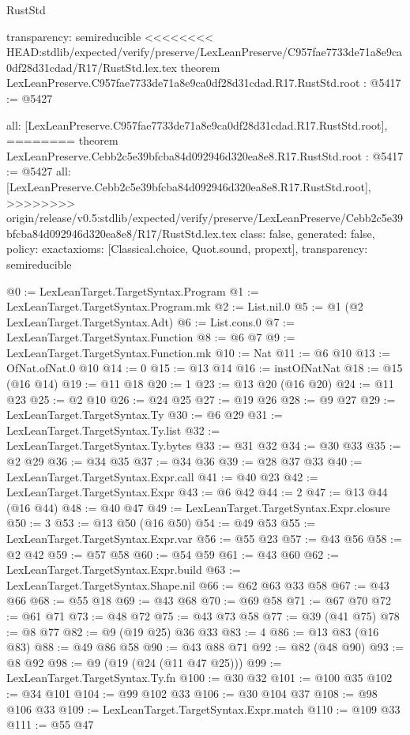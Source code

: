 \begin{lexlean}{RustStd}
\begin{coremodule}
{\begin{coremodule}
{{{{{{{{{{{{{{  transparency: semireducible
}
<<<<<<<< HEAD:stdlib/expected/verify/preserve/LexLeanPreserve/C957fae7733de71a8e9ca0df28d31cdad/R17/RustStd.lex.tex
theorem LexLeanPreserve.C957fae7733de71a8e9ca0df28d31cdad.R17.RustStd.root : @5417 := @5427 {
  all: [LexLeanPreserve.C957fae7733de71a8e9ca0df28d31cdad.R17.RustStd.root],
========
theorem LexLeanPreserve.Cebb2c5e39bfcba84d092946d320ea8e8.R17.RustStd.root : @5417 := @5427 {
  all: [LexLeanPreserve.Cebb2c5e39bfcba84d092946d320ea8e8.R17.RustStd.root],
>>>>>>>> origin/release/v0.5:stdlib/expected/verify/preserve/LexLeanPreserve/Cebb2c5e39bfcba84d092946d320ea8e8/R17/RustStd.lex.tex
  class: false,
  generated: false,
  policy: exact{axioms: [Classical.choice, Quot.sound, propext]},
  transparency: semireducible
}

@0 := LexLeanTarget.TargetSyntax.Program
@1 := LexLeanTarget.TargetSyntax.Program.mk
@2 := List.nil.{0}
@5 := @1 (@2 LexLeanTarget.TargetSyntax.Adt)
@6 := List.cons.{0}
@7 := LexLeanTarget.TargetSyntax.Function
@8 := @6 @7
@9 := LexLeanTarget.TargetSyntax.Function.mk
@10 := Nat
@11 := @6 @10
@13 := OfNat.ofNat.{0} @10
@14 := 0
@15 := @13 @14
@16 := instOfNatNat
@18 := @15 (@16 @14)
@19 := @11 @18
@20 := 1
@23 := @13 @20 (@16 @20)
@24 := @11 @23
@25 := @2 @10
@26 := @24 @25
@27 := @19 @26
@28 := @9 @27
@29 := LexLeanTarget.TargetSyntax.Ty
@30 := @6 @29
@31 := LexLeanTarget.TargetSyntax.Ty.list
@32 := LexLeanTarget.TargetSyntax.Ty.bytes
@33 := @31 @32
@34 := @30 @33
@35 := @2 @29
@36 := @34 @35
@37 := @34 @36
@39 := @28 @37 @33
@40 := LexLeanTarget.TargetSyntax.Expr.call
@41 := @40 @23
@42 := LexLeanTarget.TargetSyntax.Expr
@43 := @6 @42
@44 := 2
@47 := @13 @44 (@16 @44)
@48 := @40 @47
@49 := LexLeanTarget.TargetSyntax.Expr.closure
@50 := 3
@53 := @13 @50 (@16 @50)
@54 := @49 @53
@55 := LexLeanTarget.TargetSyntax.Expr.var
@56 := @55 @23
@57 := @43 @56
@58 := @2 @42
@59 := @57 @58
@60 := @54 @59
@61 := @43 @60
@62 := LexLeanTarget.TargetSyntax.Expr.build
@63 := LexLeanTarget.TargetSyntax.Shape.nil
@66 := @62 @63 @33 @58
@67 := @43 @66
@68 := @55 @18
@69 := @43 @68
@70 := @69 @58
@71 := @67 @70
@72 := @61 @71
@73 := @48 @72
@75 := @43 @73 @58
@77 := @39 (@41 @75)
@78 := @8 @77
@82 := @9 (@19 @25) @36 @33
@83 := 4
@86 := @13 @83 (@16 @83)
@88 := @49 @86 @58
@90 := @43 @88 @71
@92 := @82 (@48 @90)
@93 := @8 @92
@98 := @9 (@19 (@24 (@11 @47 @25)))
@99 := LexLeanTarget.TargetSyntax.Ty.fn
@100 := @30 @32
@101 := @100 @35
@102 := @34 @101
@104 := @99 @102 @33
@106 := @30 @104 @37
@108 := @98 @106 @33
@109 := LexLeanTarget.TargetSyntax.Expr.match
@110 := @109 @33
@111 := @55 @47
}}}}}}}}}}}}}}
\end{coremodule}}
\end{coremodule}
\end{lexlean}

